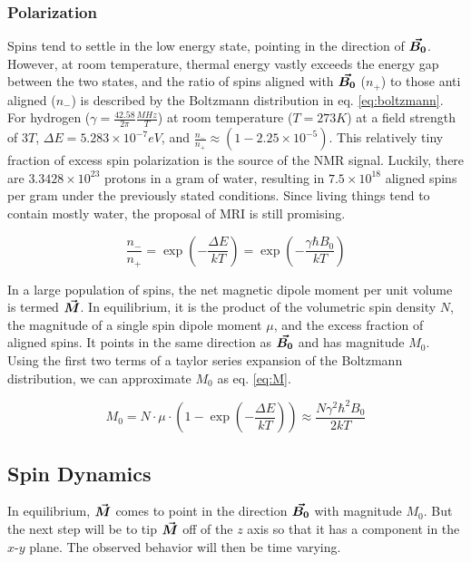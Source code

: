 \subsubsection{Polarization}
Spins tend to settle in the low energy state, pointing in the direction of $\bm{\vec{B_0}}$. However, at room temperature,
thermal energy vastly exceeds the energy gap between the two states, and the ratio of spins aligned with $\bm{\vec{B_0}}$
($n_+$) to those anti aligned ($n_-$) is described by the Boltzmann distribution in eq. \ref{eq:boltzmann}. For hydrogen
($\gamma = \frac{42.58}{2\pi} \frac{MHz}{T}$) at room temperature ($T=273 K$) at a field strength of $3T$, $\Delta E =
5.283 \times 10^{-7} eV$, and $\frac{n_-}{n_+} \approx (1 - 2.25 \times 10^{-5})$. This relatively tiny fraction of
excess spin polarization is the source of the NMR signal. Luckily, there are $3.3428 \times 10^{23}$ protons in a gram
of water, resulting in $7.5 \times 10^{18}$ aligned spins per gram under the previously stated conditions. Since living
things tend to contain mostly water, the proposal of MRI is still promising.

\begin{equation}\label{eq:boltzmann}
    \frac{n_-}{n_+} = \exp(-\frac{\Delta E}{k T}) = \exp(-\frac{\gamma \hbar B_0}{k T})
\end{equation}

In a large population of spins, the net magnetic dipole moment per unit volume is termed $\bm{\vec{M}}$. In equilibrium, it
is the product of the volumetric spin density $N$, the magnitude of a single spin dipole moment $\mu$, and the excess
fraction of aligned spins. It points in the same direction as $\bm{\vec{B_0}}$ and has magnitude $M_0$. Using the first two
terms of a taylor series expansion of the Boltzmann distribution, we can approximate $M_0$ as eq. \ref{eq:M}.

\begin{equation}\label{eq:M}
    M_0 = N \cdot \mu \cdot (1-\exp(-\frac{\Delta E}{k T})) \approx \frac{N \gamma^2 \hbar^2 B_0}{2 k T}
\end{equation}

\subsection{Spin Dynamics}
In equilibrium, $\bm{\vec{M}}$ comes to point in the direction $\bm{\vec{B_0}}$ with magnitude $M_0$. But the next step will be
to tip $\bm{\vec{M}}$ off of the $z$ axis so that it has a component in the $x$-$y$ plane. The observed behavior will then
be time varying.

